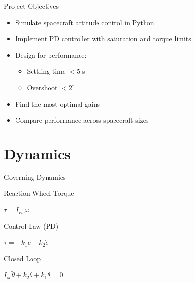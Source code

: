 \documentclass{beamer}
\begin{document}
\begin{frame}{Project Objectives}
\begin{itemize}
  \item Simulate spacecraft attitude control in Python
  \item Implement PD controller with saturation and torque limits
  \item Design for performance:
  \begin{itemize}
    \item Settling time $< 5$ s
    \item Overshoot $< 2^\circ$
  \end{itemize}
  \item Find the most optimal gains
  \item Compare performance across spacecraft sizes
\end{itemize}
\end{frame}


\section{Dynamics}
\begin{frame}{Governing Dynamics}
\begin{block}{Reaction Wheel Torque}
    \begin{center}
        $\tau = I_{rw} \dot{\omega}$
    \end{center}
\end{block}
\begin{block}{Control Law (PD)}
    \begin{center}
        $\tau = -k_1 e - k_2 \dot{e}$
    \end{center}
\end{block}
\begin{block}{Closed Loop}
    \begin{center}
        $I_{sc} \ddot{\theta} + k_2 \dot{\theta} + k_1 \theta = 0$
    \end{center}
\end{block}
\end{frame}
\end{document}

